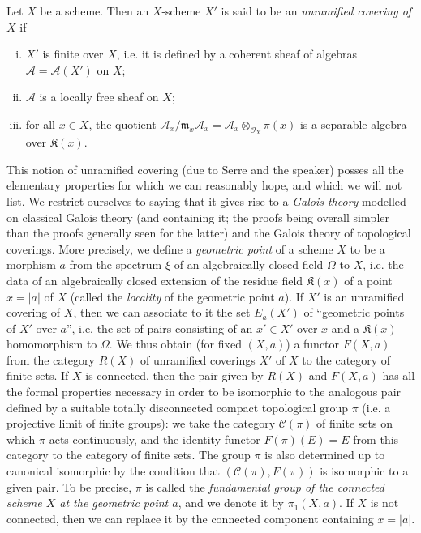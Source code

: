 \documentclass{article}
\newcommand{\scr}[1]{{\mathscr{#1}}}
\renewcommand{\cal}[1]{{\mathcal{#1}}}
\newcommand{\fk}{\mathfrak}
\newcommand{\kres}{\mathfrak{K}}
\newcommand{\oldpage}[1]{\marginpar{\footnotesize$\Big\vert$ \textit{p.~#1}}}
\begin{document}
Let $X$ be a scheme.
Then an $X$-scheme $X'$ is said to be an \emph{unramified covering of $X$}
\oldpage{182-18}
if
\begin{enumerate}[i.]
  \item $X'$ is finite over $X$, i.e. it is defined by a coherent sheaf of algebras $\scr{A}=\scr{A}(X')$ on $X$;
  \item $\scr{A}$ is a locally free sheaf on $X$;
  \item for all $x\in X$, the quotient $\scr{A}_x/\fk{m}_x\scr{A}_x = \scr{A}_x\otimes_{\scr{O}_X}\pi(x)$ is a separable algebra over $\kres(x)$.
\end{enumerate}

This notion of unramified covering (due to Serre and the speaker) posses all the elementary properties for which we can reasonably hope, and which we will not list.
We restrict ourselves to saying that it gives rise to a \emph{Galois theory} modelled on classical Galois theory (and containing it; the proofs being overall simpler than the proofs generally seen for the latter) and the Galois theory of topological coverings.
More precisely, we define a \emph{geometric point} of a scheme $X$ to be a morphism $a$ from the spectrum $\xi$ of an algebraically closed field $\Omega$ to $X$, i.e. the data of an algebraically closed extension of the residue field $\kres(x)$ of a point $x=|a|$ of $X$ (called the \emph{locality} of the geometric point $a$).
If $X'$ is an unramified covering of $X$, then we can associate to it the set $E_a(X')$ of ``geometric points of $X'$ over $a$'', i.e. the set of pairs consisting of an $x'\in X'$ over $x$ and a $\kres(x)$-homomorphism to $\Omega$.
We thus obtain (for fixed $(X,a)$) a functor $F(X,a)$ from the category $R(X)$ of unramified coverings $X'$ of $X$ to the category of finite sets.
If $X$ is connected, then the pair given by $R(X)$ and $F(X,a)$ has all the formal properties necessary in order to be isomorphic to the analogous pair defined by a suitable totally disconnected compact topological group $\pi$ (i.e. a projective limit of finite groups): we take the category $\cal{C}(\pi)$ of finite sets on which $\pi$ acts continuously, and the identity functor $F(\pi)(E)=E$ from this category to the category of finite sets.
The group $\pi$ is also determined up to canonical isomorphic by the condition that $(\cal{C}(\pi),F(\pi))$ is isomorphic to a given pair.
To be precise, $\pi$ is called the \emph{fundamental group of the connected scheme $X$ at the geometric point $a$}, and we denote it by $\pi_1(X,a)$.
If $X$ is not connected, then we can replace it by the connected component containing $x=|a|$.
\end{document}
